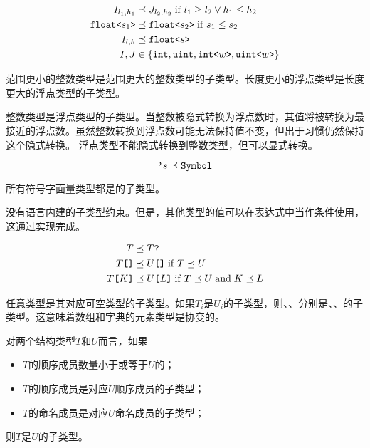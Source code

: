 \begin{equation*}
\begin{aligned}
I_{l_1,h_1} &\preceq J_{l_2,h_2} \mathrel{\mathrm{if}} l_1 \geq l_2 \lor h_1 \leq h_2 \\
    \texttt{float<}s_1\texttt{>} &\preceq \texttt{float<}s_2\texttt{>} \mathrel{\mathrm{if}} s_1 \leq s_2 \\
I_{l,h} &\preceq \texttt{float<}s\texttt{>} \\
    I, J &\in \left\{ \texttt{int}, \texttt{uint}, \texttt{int<}w\texttt{>}, \texttt{uint<}w\texttt{>} \right\}
\end{aligned}
\end{equation*}

\pnum
范围更小的整数类型是范围更大的整数类型的子类型。长度更小的浮点类型是长度更大的浮点类型的子类型。

\pnum
整数类型是浮点类型的子类型。当整数被隐式转换为浮点数时，其值将被转换为最接近的浮点数。\enternote 虽然整数转换到浮点数可能无法保持值不变，但出于习惯仍然保持这个隐式转换。 \exitnote \enternote 浮点类型不能隐式转换到整数类型，但可以显式转换。 \exitnote

$$ \texttt{'}s \preceq \texttt{Symbol} $$

\pnum
所有符号字面量类型都是的子类型。

\pnum
{}没有语言内建的子类型约束。但是，其他类型的值可以在表达式中当作条件使用，这通过实现完成。

\begin{equation*}
\begin{aligned}
T &\preceq T\texttt{?} \\
T\texttt{[]} &\preceq U\texttt{[]} \mathrel{\mathrm{if}} T \preceq U \\
T\texttt{[}K\texttt{]} &\preceq U\texttt{[}L\texttt{]} \mathrel{\mathrm{if}} T \preceq U \mathrel{\mathrm{and}} K \preceq L \\
\end{aligned}
\end{equation*}

\pnum
任意类型是其对应可空类型的子类型。如果$T_i$是$U_i$的子类型，则、、分别是、、的子类型。\enternote 这意味着数组和字典的元素类型是协变的。 \exitnote

\pnum
对两个结构类型$T$和$U$而言，如果
\begin{itemize}
    \item $T$的顺序成员数量小于或等于$U$的；
    \item $T$的顺序成员是对应$U$顺序成员的子类型；
    \item $T$的命名成员是对应$U$命名成员的子类型；
\end{itemize}
则$T$是$U$的子类型。

